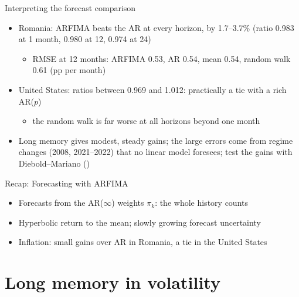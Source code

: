 \begin{frame}{Interpreting the forecast comparison}
\itemsize{\small}
\begin{itemize}
    \item Romania: ARFIMA beats the AR at every horizon, by 1.7--3.7\% (ratio 0.983 at 1 month, 0.980 at 12, 0.974 at 24)
    \begin{itemize}
        \item RMSE at 12 months: ARFIMA 0.53, AR 0.54, mean 0.54, random walk 0.61 (pp per month)
    \end{itemize}
    \item United States: ratios between 0.969 and 1.012: practically a tie with a rich AR($p$)
    \begin{itemize}
        \item the random walk is far worse at all horizons beyond one month
    \end{itemize}
    \item Long memory gives modest, steady gains; the large errors come from regime changes (2008, 2021--2022) that no linear model foresees; test the gains with Diebold--Mariano ()
\end{itemize}
\end{frame}

\begin{frame}{Recap: Forecasting with ARFIMA}
\itemsize{\small}
\begin{itemize}
    \item Forecasts from the AR($\infty$) weights $\pi_k$: the whole history counts
    \item Hyperbolic return to the mean; slowly growing forecast uncertainty
    \item Inflation: small gains over AR in Romania, a tie in the United States
\end{itemize}
\end{frame}


\section{Long memory in volatility}


